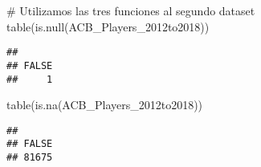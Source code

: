 \documentclass[]{article}
\newenvironment{Shaded}{\begin{snugshade}}{\end{snugshade}}
\newcommand{\KeywordTok}[1]{\textcolor[rgb]{0.94,0.87,0.69}{#1}}
\newcommand{\CommentTok}[1]{\textcolor[rgb]{0.50,0.62,0.50}{#1}}
\newcommand{\NormalTok}[1]{\textcolor[rgb]{0.80,0.80,0.80}{#1}}
\begin{document}
\begin{Shaded}
\begin{Highlighting}[]
\CommentTok{# Utilizamos las tres funciones al segundo dataset}
\KeywordTok{table}\NormalTok{(}\KeywordTok{is.null}\NormalTok{(ACB_Players_2012to2018))}
\end{Highlighting}
\end{Shaded}

\begin{verbatim}
## 
## FALSE 
##     1
\end{verbatim}

\begin{Shaded}
\begin{Highlighting}[]
\KeywordTok{table}\NormalTok{(}\KeywordTok{is.na}\NormalTok{(ACB_Players_2012to2018))}
\end{Highlighting}
\end{Shaded}

\begin{verbatim}
## 
## FALSE 
## 81675
\end{verbatim}
\end{document}
